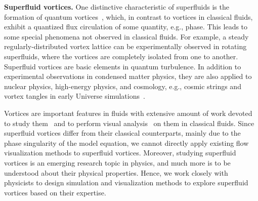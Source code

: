 \documentclass[10pt,journal,compsoc,twoside]{IEEEtran}
\begin{document}
	\vspace*{1.5mm}
	\noindent
	{\bf Superfluid vortices.}
	One distinctive characteristic of superfluids is the formation of quantum vortices~\cite{Abo-Shaeer_01,Lathrop_06}, which, in contrast to vortices in classical fluids, exhibit a quantized flux circulation of some quantity, e.g., phase.
	This leads to some special phenomena not observed in classical fluids.
	For example, a steady regularly-distributed vortex lattice can be experimentally observed in rotating superfluids, where the vortices are completely isolated from one to another.
	Superfluid vortices are basic elements in quantum turbulence.
	In addition to experimental observations in condensed matter physics, they are also applied to nuclear physics, high-energy physics, and cosmology, e.g., cosmic strings and vortex tangles in early Universe simulations~\cite{Huang-2012,HXZ_14,PRD_14}.
	
	Vortices are important features in fluids with extensive amount of work devoted to study them~\cite{PF_07,JFM_05} and to perform visual analysis~\cite{Schafhitzel_11,Koehler_11,Treib_12,Hummel_13,Clyne_13,Shafii_13} on them in classical fluids.
	Since superfluid vortices differ from their classical counterparts, mainly due to the phase singularity of the model equation, we cannot directly apply existing flow visualization methods to superfluid vortices.
	Moreover, studying superfluid vortices is an emerging research topic in physics, and much more is to be understood about their physical properties.
	Hence, we work closely with physicists to design simulation and visualization methods to explore superfluid vortices based on their expertise.
	
	
	
\end{document}

